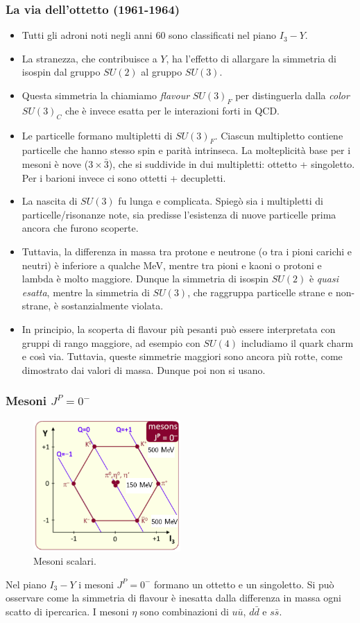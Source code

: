 \subsubsection{La via dell'ottetto (1961-1964)}
\begin{itemize}
\item Tutti gli adroni noti negli anni 60 sono classificati nel piano $I_3-Y$.
\item La stranezza, che contribuisce a $Y$, ha l'effetto di allargare la simmetria di isospin dal gruppo $SU(2)$ al gruppo $SU(3)$.
\item Questa simmetria la chiamiamo \textit{flavour} $SU(3)_F$ per distinguerla dalla \textit{color} $SU(3)_C$ che è invece esatta per le interazioni forti in QCD.
\item Le particelle formano multipletti di $SU(3)_F$. Ciascun multipletto contiene particelle che hanno stesso spin e parità intrinseca. La molteplicità base per i mesoni è nove ($3\times\bar3$), che si suddivide in dui multipletti: ottetto + singoletto. Per i barioni invece ci sono ottetti + decupletti.
\item La nascita di $SU(3)$ fu lunga e complicata. Spiegò sia i multipletti di particelle/risonanze note, sia predisse l'esistenza di nuove particelle prima ancora che furono scoperte.
\item Tuttavia, la differenza in massa tra protone e neutrone (o tra i pioni carichi e neutri) è inferiore a qualche MeV, mentre tra pioni e kaoni o protoni e lambda è molto maggiore. Dunque la simmetria di isospin $SU(2)$ è \textit{quasi esatta}, mentre la simmetria di $SU(3)$, che raggruppa particelle strane e non-strane, è sostanzialmente violata.
\item In principio, la scoperta di flavour più pesanti può essere interpretata con gruppi di rango maggiore, ad esempio con $SU(4)$ includiamo il quark charm e così via. Tuttavia, queste simmetrie maggiori sono ancora più rotte, come dimostrato dai valori di massa. Dunque poi non si usano.
\end{itemize}
\subsubsection{Mesoni $J^P=0^-$}
\begin{figure}[H]
    \centering
    \includegraphics[width=0.5\textwidth]{immagini/fig_mesoni_0_meno.png}
    \caption{Mesoni scalari.}
  \end{figure}
Nel piano $I_3-Y$ i mesoni $J^P=0^-$ formano un ottetto e un singoletto. Si può osservare come la simmetria di flavour è inesatta dalla differenza in massa ogni scatto di ipercarica. I mesoni $\eta$ sono combinazioni di $u\bar u$, $d\bar d$ e $s\bar s$.
